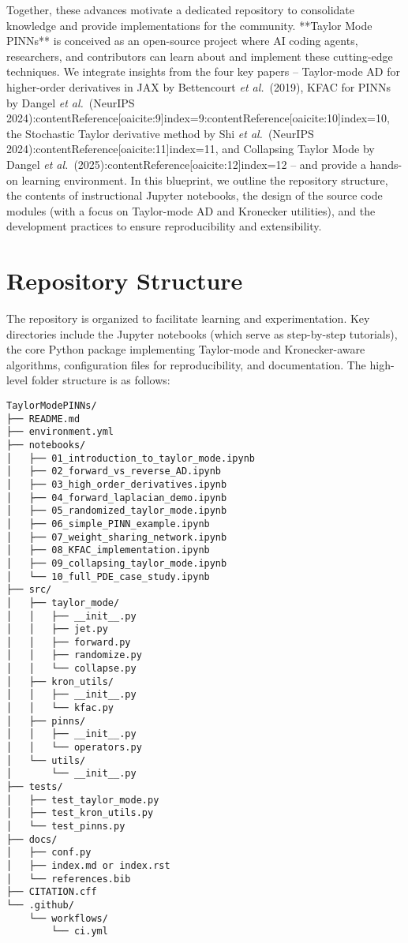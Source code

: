 \documentclass[11pt]{article}
\begin{document}
Together, these advances motivate a dedicated repository to consolidate knowledge and provide implementations for the community. **Taylor Mode PINNs** is conceived as an open-source project where AI coding agents, researchers, and contributors can learn about and implement these cutting-edge techniques. We integrate insights from the four key papers – Taylor-mode AD for higher-order derivatives in JAX by Bettencourt \textit{et al.}\ (2019), KFAC for PINNs by Dangel \textit{et al.}\ (NeurIPS 2024):contentReference[oaicite:9]{index=9}:contentReference[oaicite:10]{index=10}, the Stochastic Taylor derivative method by Shi \textit{et al.}\ (NeurIPS 2024):contentReference[oaicite:11]{index=11}, and Collapsing Taylor Mode by Dangel \textit{et al.}\ (2025):contentReference[oaicite:12]{index=12} – and provide a hands-on learning environment. In this blueprint, we outline the repository structure, the contents of instructional Jupyter notebooks, the design of the source code modules (with a focus on Taylor-mode AD and Kronecker utilities), and the development practices to ensure reproducibility and extensibility.

\section{Repository Structure}

The repository is organized to facilitate learning and experimentation. Key directories include the Jupyter notebooks (which serve as step-by-step tutorials), the core Python package implementing Taylor-mode and Kronecker-aware algorithms, configuration files for reproducibility, and documentation. The high-level folder structure is as follows:

\begin{verbatim}
TaylorModePINNs/
├── README.md
├── environment.yml
├── notebooks/
│   ├── 01_introduction_to_taylor_mode.ipynb
│   ├── 02_forward_vs_reverse_AD.ipynb
│   ├── 03_high_order_derivatives.ipynb
│   ├── 04_forward_laplacian_demo.ipynb
│   ├── 05_randomized_taylor_mode.ipynb
│   ├── 06_simple_PINN_example.ipynb
│   ├── 07_weight_sharing_network.ipynb
│   ├── 08_KFAC_implementation.ipynb
│   ├── 09_collapsing_taylor_mode.ipynb
│   └── 10_full_PDE_case_study.ipynb
├── src/
│   ├── taylor_mode/
│   │   ├── __init__.py
│   │   ├── jet.py
│   │   ├── forward.py
│   │   ├── randomize.py
│   │   └── collapse.py
│   ├── kron_utils/
│   │   ├── __init__.py
│   │   └── kfac.py
│   ├── pinns/
│   │   ├── __init__.py
│   │   └── operators.py
│   └── utils/
│       └── __init__.py
├── tests/
│   ├── test_taylor_mode.py
│   ├── test_kron_utils.py
│   └── test_pinns.py
├── docs/
│   ├── conf.py
│   ├── index.md or index.rst
│   └── references.bib
├── CITATION.cff
└── .github/
    └── workflows/
        └── ci.yml
\end{verbatim}
\end{document}
